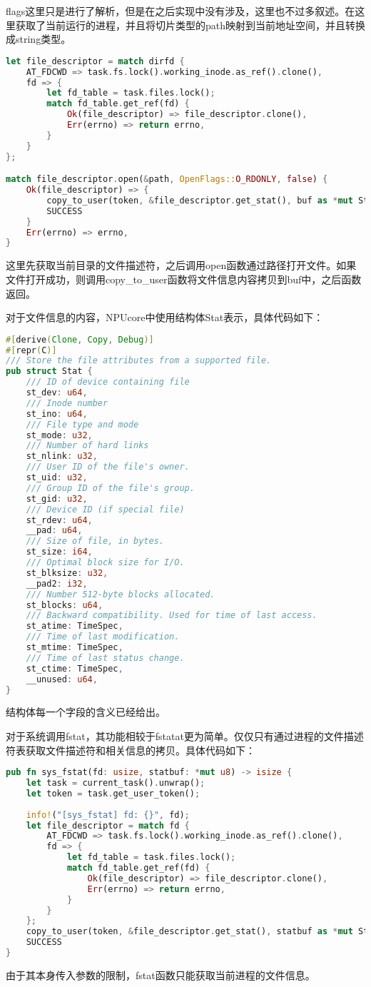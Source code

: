 flags这里只是进行了解析，但是在之后实现中没有涉及，这里也不过多叙述。在这里获取了当前运行的进程，并且将切片类型的path映射到当前地址空间，并且转换成string类型。

\begin{lstlisting}[language={Rust}, label={code:fstatat_part2},
	caption={fstatat_part2}]
let file_descriptor = match dirfd {
	AT_FDCWD => task.fs.lock().working_inode.as_ref().clone(),
	fd => {
		let fd_table = task.files.lock();
		match fd_table.get_ref(fd) {
			Ok(file_descriptor) => file_descriptor.clone(),
			Err(errno) => return errno,
		}
	}
};

match file_descriptor.open(&path, OpenFlags::O_RDONLY, false) {
	Ok(file_descriptor) => {
		copy_to_user(token, &file_descriptor.get_stat(), buf as *mut Stat);
		SUCCESS
	}
	Err(errno) => errno,
}
\end{lstlisting}

这里先获取当前目录的文件描述符，之后调用open函数通过路径打开文件。如果文件打开成功，则调用copy_to_user函数将文件信息内容拷贝到buf中，之后函数返回。

对于文件信息的内容，NPUcore中使用结构体Stat表示，具体代码如下：
\begin{lstlisting}[language={Rust}, label={code:Stat},
	caption={Stat}]
#[derive(Clone, Copy, Debug)]
#[repr(C)]
/// Store the file attributes from a supported file.
pub struct Stat {
	/// ID of device containing file
	st_dev: u64,
	/// Inode number
	st_ino: u64,
	/// File type and mode   
	st_mode: u32,
	/// Number of hard links
	st_nlink: u32,
	/// User ID of the file's owner.
	st_uid: u32,
	/// Group ID of the file's group.
	st_gid: u32,
	/// Device ID (if special file)
	st_rdev: u64,
	__pad: u64,
	/// Size of file, in bytes.
	st_size: i64,
	/// Optimal block size for I/O.
	st_blksize: u32,
	__pad2: i32,
	/// Number 512-byte blocks allocated.
	st_blocks: u64,
	/// Backward compatibility. Used for time of last access.
	st_atime: TimeSpec,
	/// Time of last modification.
	st_mtime: TimeSpec,
	/// Time of last status change.
	st_ctime: TimeSpec,
	__unused: u64,
}
\end{lstlisting}

结构体每一个字段的含义已经给出。

对于系统调用fstat，其功能相较于fstatat更为简单。仅仅只有通过进程的文件描述符表获取文件描述符和相关信息的拷贝。具体代码如下：

\begin{lstlisting}[language={Rust}, label={code:fstat},
	caption={fstat}]
pub fn sys_fstat(fd: usize, statbuf: *mut u8) -> isize {
	let task = current_task().unwrap();
	let token = task.get_user_token();
	
	info!("[sys_fstat] fd: {}", fd);
	let file_descriptor = match fd {
		AT_FDCWD => task.fs.lock().working_inode.as_ref().clone(),
		fd => {
			let fd_table = task.files.lock();
			match fd_table.get_ref(fd) {
				Ok(file_descriptor) => file_descriptor.clone(),
				Err(errno) => return errno,
			}
		}
	};
	copy_to_user(token, &file_descriptor.get_stat(), statbuf as *mut Stat);
	SUCCESS
}
\end{lstlisting}

由于其本身传入参数的限制，fstat函数只能获取当前进程的文件信息。